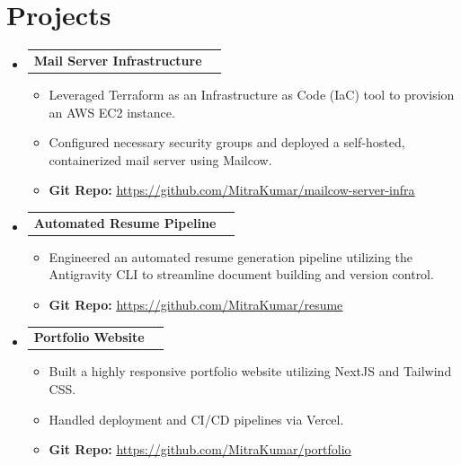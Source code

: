 \documentclass[a4paper,10pt]{article}
\makeatletter
\newcommand{\resumeItem}[1]{\item\small{#1}}
\newcommand{\resumeProject}[2]{
  \vspace{-1pt}\item
    \begin{tabular*}{1.0\textwidth}[t]{l@{\extracolsep{\fill}}r}
      \textbf{#1} & #2 \\
    \end{tabular*}\vspace{-5pt}
}
\makeatother
\begin{document}
\section{Projects}
\begin{itemize}[leftmargin=0.15in, label={}]
  \resumeProject
    {Mail Server Infrastructure}{}
    \begin{itemize}[leftmargin=0.15in]
        \resumeItem{Leveraged Terraform as an Infrastructure as Code (IaC) tool to provision an AWS EC2 instance.}
        \resumeItem{Configured necessary security groups and deployed a self-hosted, containerized mail server using Mailcow.}
        \resumeItem{\textbf{Git Repo:} \href{https://github.com/MitraKumar/mailcow-server-infra}{\underline{https://github.com/MitraKumar/mailcow-server-infra}}}
    \end{itemize}

  \resumeProject
    {Automated Resume Pipeline}{}
    \begin{itemize}[leftmargin=0.15in]
        \resumeItem{Engineered an automated resume generation pipeline utilizing the Antigravity CLI to streamline document building and version control.}
        \resumeItem{\textbf{Git Repo:} \href{https://github.com/MitraKumar/resume}{\underline{https://github.com/MitraKumar/resume}}}
    \end{itemize}

  \resumeProject
    {Portfolio Website}{}
    \begin{itemize}[leftmargin=0.15in]
        \resumeItem{Built a highly responsive portfolio website utilizing NextJS and Tailwind CSS.}
        \resumeItem{Handled deployment and CI/CD pipelines via Vercel.}
        \resumeItem{\textbf{Git Repo:} \href{https://github.com/MitraKumar/portfolio}{\underline{https://github.com/MitraKumar/portfolio}}}
    \end{itemize}
\end{itemize}
\end{document}
